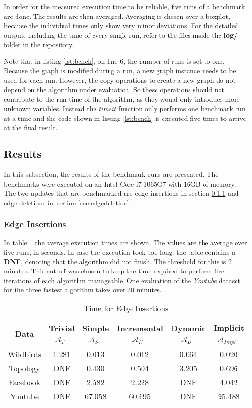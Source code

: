 \documentclass[letterpaper,11pt]{article}
\newcommand{\trivial}{$\mathcal{A}_T$\ }
\newcommand{\simple}{$\mathcal{A}_S$\ }
\newcommand{\improvedinc}{$\mathcal{A}_{II}$\ }
\newcommand{\dynamic}{$\mathcal{A}_{D}$\ }
\newcommand{\implicit}{$\mathcal{A}_{Impl}$\ }
\begin{document}
In order for the measured execution time to be reliable, five runs of a
benchmark are done. The results are then averaged. Averaging is chosen over a
boxplot, because the individual times only show very minor deviations.
For the detailed output, including the time of every single run, refer to the
files inside the \textbf{log/} folder in the repository.

Note that in listing \ref{lst:bench}, on line 6, the number of runs is set to
one. Because the graph is modified during a run, a new graph instance needs to
be used for each run. However, the copy operations to create a new graph do not
depend on the algorithm under evaluation. So these operations should not
contribute to the run time of the algorithm, as they would only introduce more
unknown variables. Instead the \textit{timeit} function only performs one
benchmark run at a time and the code shown in listing \ref{lst:bench} is executed
five times to arrive at the final result.

\subsection{Results}

In this subsection, the results of the benchmark runs are presented. The
benchmarks were executed on an Intel Core i7-1065G7 with 16GB of memory. The two
updates that are benchmarked are edge insertions in section
\ref{sec:edgeinsertion} and edge deletions in section \ref{sec:edgedeletion}.


\subsubsection{Edge Insertions}
\label{sec:edgeinsertion}

In table \ref{tab:insertion} the average execution times are shown. The values
are the average over five runs, in seconds. In case the execution took too long,
the table contains a \textbf{DNF}, denoting that the algorithm did not finish.
The threshold for this is 2 minutes. This cut-off was chosen to keep the time
required to perform five iterations of each algorithm manageable. One evaluation
of the \textit{Youtube} dataset for the three fastest algorithm takes over 20
minutes.


\begin{table}[H]
  \caption{Time for Edge Insertions}
  \label{tab:insertion}
  \centering
  \setlength{\extrarowheight}{0.3em}
  \begin{tabular}{|c|c|c|c|c|c|}
    \hline
    Data & Trivial \trivial & Simple \simple & Incremental \improvedinc & Dynamic \dynamic & Implicit \implicit \\
    \hline
    \hline
    Wildbirds & 1.281 & 0.013 & 0.012 & 0.064 & 0.020 \\
    \hline
    Topology & DNF & 0.430 & 0.504 & 3.205 & 0.696 \\
    \hline
    Facebook & DNF & 2.582 & 2.228 & DNF & 4.042 \\
    \hline
    Youtube & DNF & 67.058 & 60.695 & DNF & 95.488 \\
    \hline
  \end{tabular}
\end{table}
\end{document}
